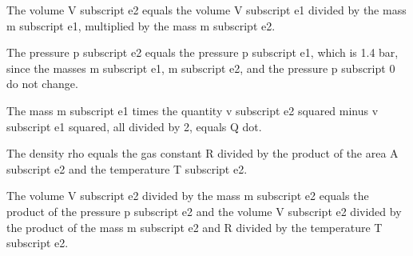 The volume V subscript e2 equals the volume V subscript e1 divided by the mass m subscript e1, multiplied by the mass m subscript e2.

The pressure p subscript e2 equals the pressure p subscript e1, which is 1.4 bar, since the masses m subscript e1, m subscript e2, and the pressure p subscript 0 do not change.

The mass m subscript e1 times the quantity v subscript e2 squared minus v subscript e1 squared, all divided by 2, equals Q dot.

The density rho equals the gas constant R divided by the product of the area A subscript e2 and the temperature T subscript e2.

The volume V subscript e2 divided by the mass m subscript e2 equals the product of the pressure p subscript e2 and the volume V subscript e2 divided by the product of the mass m subscript e2 and R divided by the temperature T subscript e2.